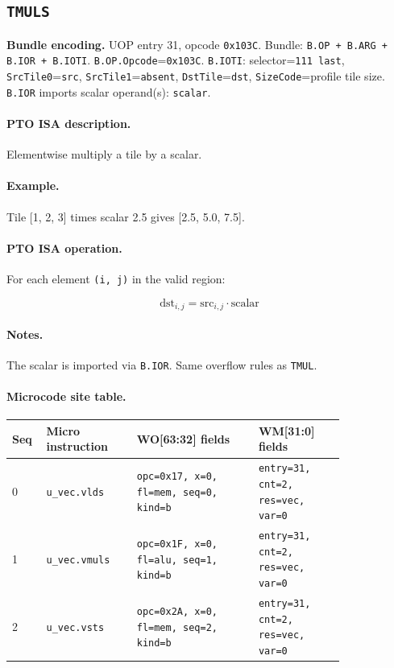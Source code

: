 \subsection{\texttt{TMULS}}
\noindent\textbf{Bundle encoding.} UOP entry 31, opcode \texttt{0x103C}. Bundle: \texttt{B.OP + B.ARG + B.IOR + B.IOTI}. \texttt{B.OP.Opcode}=\texttt{0x103C}. \texttt{B.IOTI}: selector=\texttt{111 last}, \texttt{SrcTile0}=\texttt{src}, \texttt{SrcTile1}=\texttt{absent}, \texttt{DstTile}=\texttt{dst}, \texttt{SizeCode}=profile tile size. \texttt{B.IOR} imports scalar operand(s): \texttt{scalar}.\par\smallskip
{\small
\paragraph{PTO ISA description.}
Elementwise multiply a tile by a scalar.
\paragraph{Example.}
Tile [1, 2, 3] times scalar 2.5 gives [2.5, 5.0, 7.5].
\par\smallskip
\paragraph{PTO ISA operation.}
For each element \texttt{(i, j)} in the valid region:

\[
\mathrm{dst}_{i,j} = \mathrm{src}_{i,j} \cdot \mathrm{scalar}
\]
}\par\smallskip
\paragraph{Notes.}
The scalar is imported via \texttt{B.IOR}. Same overflow rules as \texttt{TMUL}.
\paragraph{Microcode site table.}
{\scriptsize
\begin{longtable}{@{}R{0.055\linewidth}L{0.23\linewidth}L{0.31\linewidth}L{0.22\linewidth}@{}}
\toprule
Seq & Micro instruction & WO[63:32] fields & WM[31:0] fields \\
 & \texttt{u\_vec.vlds} & \texttt{opc=0x17, x=0, fl=mem, seq=0, kind=b} & \texttt{entry=31, cnt=2, res=vec, var=0} \\
1 & \texttt{u\_vec.vmuls} & \texttt{opc=0x1F, x=0, fl=alu, seq=1, kind=b} & \texttt{entry=31, cnt=2, res=vec, var=0} \\
2 & \texttt{u\_vec.vsts} & \texttt{opc=0x2A, x=0, fl=mem, seq=2, kind=b} & \texttt{entry=31, cnt=2, res=vec, var=0} \\
\bottomrule
\end{longtable}
}
